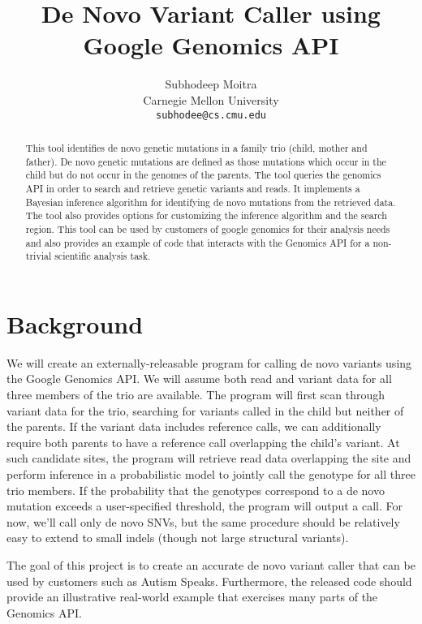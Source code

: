 \documentclass{article}
\begin{document}
\title{De Novo Variant Caller using Google Genomics API}

\author{
	Subhodeep Moitra\\ 
	Carnegie Mellon University \\
	{\tt subhodee@cs.cmu.edu}
}

\maketitle

\begin{abstract}
This tool identifies de novo genetic mutations in a family trio (child, mother and father). De novo genetic mutations are defined as those mutations which occur in the child but do not occur in the genomes of the parents. The tool queries the genomics API in order to search and retrieve genetic variants and reads. It implements a Bayesian inference algorithm for identifying  de novo mutations from the retrieved data. The tool also provides options for customizing the inference algorithm and the search region. This tool can be used by customers of google genomics for their analysis needs and also provides an example of code that interacts with the Genomics API for a non-trivial scientific analysis task.
\end{abstract} 

\section{Background}
We will create an externally-releasable program for calling de novo variants using the Google Genomics API.  We will assume both read and variant data for all three members of the trio are available.  The program will first scan through variant data for the trio, searching for variants called in the child but neither of the parents.  If the variant data includes reference calls, we can additionally require both parents to have a reference call overlapping the child's variant.  At such candidate sites, the program will retrieve read data overlapping the site and perform inference in a probabilistic model to jointly call the genotype for all three trio members.  If the probability that the genotypes correspond to a de novo mutation exceeds a user-specified threshold, the program will output a call.  For now, we'll call only de novo SNVs, but the same procedure should be relatively easy to extend to small indels (though not large structural variants).

The goal of this project is to create an accurate de novo variant caller that can be used by customers such as Autism Speaks.  Furthermore, the released code should provide an illustrative real-world example that exercises many parts of the Genomics API.
\end{document}
